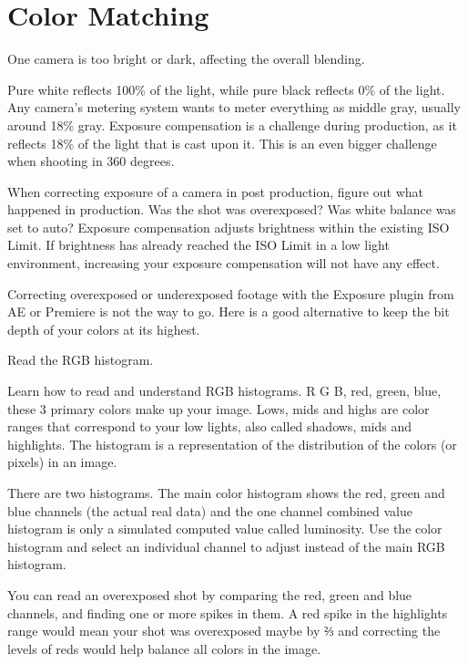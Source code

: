 \chapter{Color Matching}
\pagecolor{white}
\label{chap:32}
\begin{fullwidth}


\problem

{\large One camera is too bright or dark, affecting the overall blending. \par}

Pure white reflects 100\% of the light, while pure black reflects 0\% of the light. Any camera’s metering system wants to meter everything as middle gray, usually around 18\% gray. Exposure compensation is a challenge during production, as it reflects 18\% of the light that is cast upon it. This is an even bigger challenge when shooting in 360 degrees. 

When correcting exposure of a camera in post production, figure out what happened in production. Was the shot was overexposed? Was white balance was set to auto? Exposure compensation adjusts brightness within the existing ISO Limit. If brightness has already reached the ISO Limit in a low light environment, increasing your exposure compensation will not have any effect.

Correcting overexposed or underexposed footage with the Exposure plugin from AE or Premiere is not the way to go. Here is a good alternative to keep the bit depth of your colors at its highest.

\solution

{\large Read the RGB histogram. \par}

Learn how to read and understand RGB histograms. R G B, red, green, blue, these 3 primary colors make up your image. Lows, mids and highs are color ranges that correspond to your low lights, also called shadows, mids and highlights. The histogram is a representation of the distribution of the colors (or pixels) in an image. 

There are two histograms. The main color histogram shows the red, green and blue channels (the actual real data) and the one channel combined value histogram is only a simulated computed value called luminosity. Use the color histogram and select an individual channel to adjust instead of the main RGB histogram.

You can read an overexposed shot by comparing the red, green and blue channels, and finding one or more spikes in them. A red spike in the highlights range would mean your shot was overexposed maybe by ⅔  and correcting the levels of reds would help balance all colors in the image.


\end{fullwidth}
